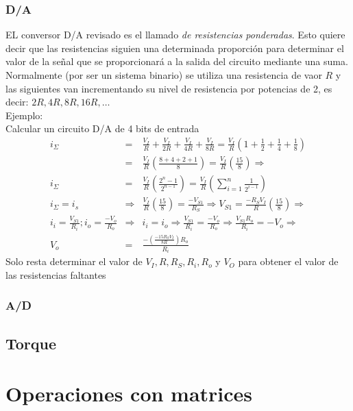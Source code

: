 \documentclass[12pt,spanish,lettersize]{report}
\begin{document}
\subsection{D/A}
EL conversor D/A revisado es el llamado \emph{de resistencias ponderadas}. Esto quiere decir que las resistencias siguien una determinada proporci\'on para determinar el valor de la se\~nal que se proporcionar\'a a la salida del circuito mediante una suma.\\
Normalmente (por ser un sistema binario) se utiliza una resistencia de vaor $R$ y las siguientes van incrementando su nivel de resistencia por potencias de 2, es decir: $2R,4R,8R,16R,\dots$\\
Ejemplo:\\
Calcular un circuito D/A de 4 bits de entrada\\
\begin{eqnarray}
\nonumber i_\Sigma&=&\frac{V_I}{R}+\frac{V_I}{2R}+\frac{V_I}{4R}+\frac{V_I}{8R}=\frac{V_I}{R}\left(1+\frac{1}{2}+\frac{1}{4}+\frac{1}{8}\right)\\
\nonumber&=&\frac{V_I}{R}\left(\frac{8+4+2+1}{8}\right)=\frac{V_I}{R}\left(\frac{15}{8}\right)\Rightarrow\\
i_\Sigma&=&\frac{V_I}{R}\left(\frac{2^n-1}{2^{n-1}}\right)=\frac{V_I}{R}\left(\sum_{i=1}^n\frac{1}{2^{i-1}}\right)\\
\nonumber i_\Sigma=i_s&\Rightarrow&\frac{V_I}{R}\left(\frac{15}{8}\right)=\frac{-V_{S1}}{R_S}\Rightarrow V_{S1}=\frac{-R_SV_I}{R}\left(\frac{15}{8}\right)\Rightarrow\\
\nonumber i_i=\frac{V_{S1}}{R_i}; i_o=\frac{-V_o}{R_o}&\Rightarrow&i_i=i_o\Rightarrow\frac{V_{S1}}{R_i}=\frac{-V_o}{R_o}\Rightarrow\frac{V_{S1}R_o}{R_i}=-V_o\Rightarrow\\
V_o&=&\frac{-\left(\frac{-15R_SV_I}{8R}\right)R_o}{R_i}
\end{eqnarray}
Solo resta determinar el valor de $V_I, R, R_S, R_i, R_o$ y $V_O$ para obtener el valor de las resistencias faltantes
\subsection{A/D}
\section{Torque}
\appendix
\chapter{Operaciones con matrices}
\end{document}
